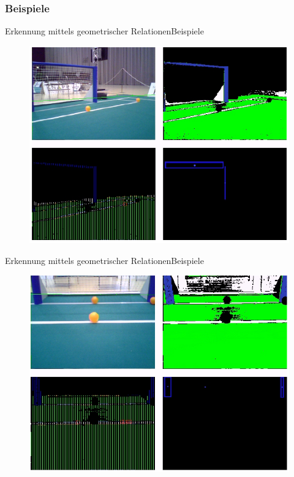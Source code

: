 \documentclass{beamer}
\begin{document}
\subsubsection{Beispiele}
\begin{frame}{Erkennung mittels geometrischer Relationen}{Beispiele}
\begin{figure}[htp]
\centering
\includegraphics[scale=0.45]{example-detection1.png}
\end{figure}
\end{frame}

\begin{frame}{Erkennung mittels geometrischer Relationen}{Beispiele}
\begin{figure}[htp]
\centering
\includegraphics[scale=0.5]{example-detection2.png}
\end{figure}
\end{frame}
\end{document}
